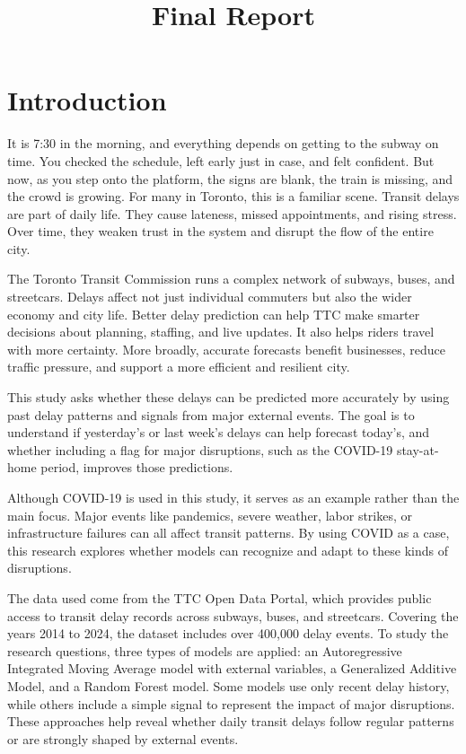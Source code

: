 \documentclass[
]{article}
\title{Final Report}
\author{}
\date{\vspace{-2.5em}}
\begin{document}
\maketitle

\section{Introduction}\label{introduction}

It is 7:30 in the morning, and everything depends on getting to the
subway on time. You checked the schedule, left early just in case, and
felt confident. But now, as you step onto the platform, the signs are
blank, the train is missing, and the crowd is growing. For many in
Toronto, this is a familiar scene. Transit delays are part of daily
life. They cause lateness, missed appointments, and rising stress. Over
time, they weaken trust in the system and disrupt the flow of the entire
city.

The Toronto Transit Commission runs a complex network of subways, buses,
and streetcars. Delays affect not just individual commuters but also the
wider economy and city life. Better delay prediction can help TTC make
smarter decisions about planning, staffing, and live updates. It also
helps riders travel with more certainty. More broadly, accurate
forecasts benefit businesses, reduce traffic pressure, and support a
more efficient and resilient city.

This study asks whether these delays can be predicted more accurately by
using past delay patterns and signals from major external events. The
goal is to understand if yesterday's or last week's delays can help
forecast today's, and whether including a flag for major disruptions,
such as the COVID-19 stay-at-home period, improves those predictions.

Although COVID-19 is used in this study, it serves as an example rather
than the main focus. Major events like pandemics, severe weather, labor
strikes, or infrastructure failures can all affect transit patterns. By
using COVID as a case, this research explores whether models can
recognize and adapt to these kinds of disruptions.

The data used come from the TTC Open Data Portal, which provides public
access to transit delay records across subways, buses, and streetcars.
Covering the years 2014 to 2024, the dataset includes over 400,000 delay
events. To study the research questions, three types of models are
applied: an Autoregressive Integrated Moving Average model with external
variables, a Generalized Additive Model, and a Random Forest model. Some
models use only recent delay history, while others include a simple
signal to represent the impact of major disruptions. These approaches
help reveal whether daily transit delays follow regular patterns or are
strongly shaped by external events.
\end{document}
